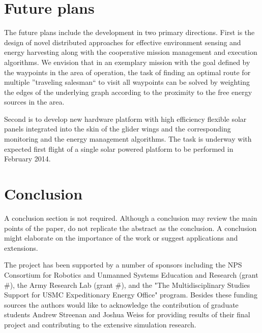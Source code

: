 \documentclass{ifacconf}
\begin{document}
\section{Future plans}
\label{sec:Future}
The future plans include the development in two primary directions. First is the design of novel distributed approaches for effective environment sensing and energy harvesting along with the cooperative mission management and execution algorithms. We envision that in an exemplary mission with the goal defined by the waypoints in the area of operation, the task of finding an optimal route for multiple ''traveling salesman`` to visit all waypoints can be solved by weighting the edges of the underlying graph according to the proximity to the free energy sources in the area.

Second is to develop new hardware platform with high efficiency flexible solar panels integrated into the skin of the glider wings and the corresponding monitoring and the energy management algorithms. The task is underway with expected first flight of a single solar powered platform to be performed in February 2014.

\section{Conclusion}

A conclusion section is not required. Although a conclusion may review the main points of the paper, do not replicate the abstract as the conclusion. A conclusion might elaborate on the importance of the work or suggest applications and extensions.

\begin{ack}                               %
The project has been supported by a number of sponsors including the NPS Consortium for Robotics and Unmanned Systems Education and Research (grant $\#$), the Army Research Lab (grant $\#$), and the "The Multidisciplinary Studies Support for USMC Expeditionary Energy Office" program. Besides these funding sources the authors would like to acknowledge the contribution of graduate students Andrew Streenan and Joshua Weiss for providing results of their final project and contributing to the extensive simulation research.
\end{ack}



\end{document}
